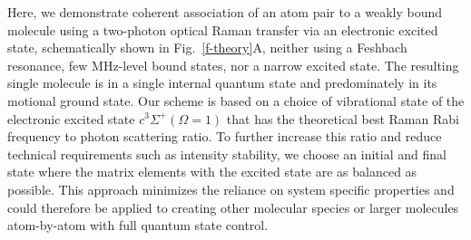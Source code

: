 \documentclass[aps,prl,twocolumn,superscriptaddress]{revtex4-1}
\begin{document}
Here, we demonstrate coherent association of an atom pair to a weakly bound molecule using a two-photon optical Raman transfer via an electronic excited state, schematically shown in Fig.~\ref{f-theory}A, neither using a Feshbach resonance, few MHz-level bound states, nor a narrow excited state. The resulting single molecule is in a single internal quantum state and predominately in its motional ground state.  Our scheme is based on a choice of vibrational state of the electronic excited state $c^3\Sigma^+(\Omega = 1)$ that has the theoretical best Raman Rabi frequency to photon scattering ratio. To further increase this ratio and reduce technical requirements such as intensity stability, we choose an initial and final state where the matrix elements with the excited state are as balanced as possible. This approach minimizes the reliance on system specific properties and could therefore be applied to creating other molecular species or larger molecules atom-by-atom with full quantum state control.





\end{document}
